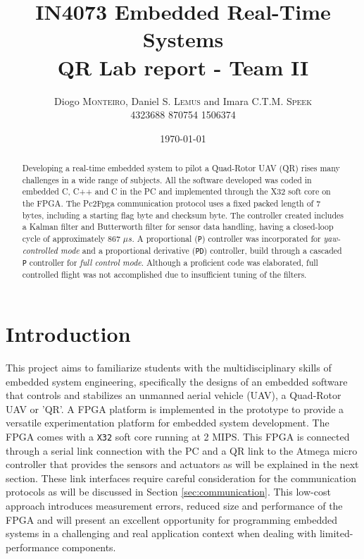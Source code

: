 \documentclass{article}
\title{IN4073 Embedded Real-Time Systems \\ QR Lab report - Team II} %
\author{Diogo \textsc{Monteiro}, Daniel S. \textsc{Lemus} and Imara C.T.M. \textsc{Speek} \\
		4323688 870754 1506374} %
\date{\today} %
\begin{document}
\maketitle %

 \begin{abstract}
Developing a real-time embedded system to pilot a Quad-Rotor UAV (QR) rises many challenges in a wide range of subjects. All the software developed was coded in embedded C, C++ and C in the PC and  implemented through the X32 soft core on the FPGA. The Pc2Fpga communication protocol uses a fixed packed length of 7 bytes, including a starting flag byte and checksum byte. The controller created includes a Kalman filter and Butterworth filter for sensor data handling, having a closed-loop cycle of approximately 867 $\mu s$. A proportional (\texttt{P}) controller was incorporated for \textit{yaw-controlled mode} and a proportional derivative (\texttt{PD}) controller, build through a cascaded \texttt{P} controller for \textit{full control mode}. Although a proficient code was elaborated, full controlled flight was not accomplished due to insufficient tuning of the filters.

 \end{abstract}


\section{Introduction}
\label{sec:introduction}
This project aims to familiarize students with the multidisciplinary skills of embedded system engineering, specifically the designs of an embedded software that controls and stabilizes an unmanned aerial vehicle (UAV), a Quad-Rotor UAV or 'QR'. A FPGA platform is implemented in the prototype to provide a versatile experimentation platform for embedded system development. The FPGA comes with a \texttt{X32} soft core running at 2 MIPS. 
This FPGA is connected through a serial link connection with the PC and a QR link to the Atmega micro controller that provides the sensors and actuators as will be explained in the next section. These link interfaces require careful consideration for the communication protocols as will be discussed in Section \ref{sec:communication}. This low-cost approach introduces measurement errors, reduced size and performance of the FPGA and will present an excellent opportunity for programming embedded systems in a challenging and real application context when dealing with limited-performance components.  
\end{document}
